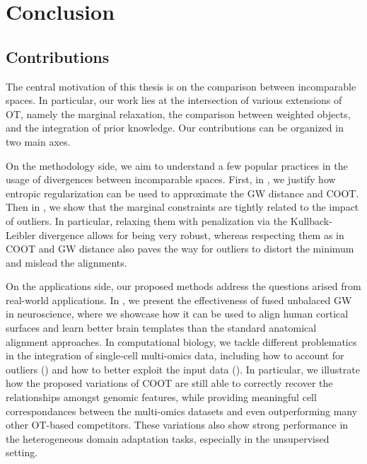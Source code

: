 \chapter[Conclusion]{Conclusion}


\renewcommand{\contentsname}{Contents}
\localtableofcontents*
{}

\section{Contributions}

The central motivation of this thesis is on the comparison between incomparable spaces.
In particular, our work lies at the intersection of various extensions of OT,
namely the marginal relaxation, the comparison between weighted objects,
and the integration of prior knowledge. Our contributions can be organized in two main axes.

On the methodology side, we aim to understand a few popular practices in the usage of
divergences between incomparable spaces. First, in ,
we justify how entropic regularization can be used to approximate the GW distance and COOT.
Then in ,
we show that the marginal constraints are tightly related to the impact of outliers. In particular,
relaxing them with penalization via the Kullback-Leibler divergence allows for being very robust,
whereas respecting them as in COOT and GW distance also paves the way for outliers to distort the
minimum and mislead the alignments.

On the applications side, our proposed methods address the questions arised from real-world
applications. In , we present the effectiveness of fused unbalaced GW in neuroscience,
where we showcase how it can be used to align human cortical surfaces and
learn better brain templates than the standard anatomical alignment approaches.
In computational biology, we tackle different problematics in the integration of
single-cell multi-omics data, including how to account for outliers ()
and how to better exploit the input data ().
In particular, we illustrate how the proposed variations of COOT are still able to correctly recover
the relationships amongst genomic features, while providing meaningful
cell correspondances between the multi-omics datasets and even outperforming
many other OT-based competitors. These variations also show strong performance in the
heterogeneous domain adaptation tasks, especially in the unsupervised setting.

